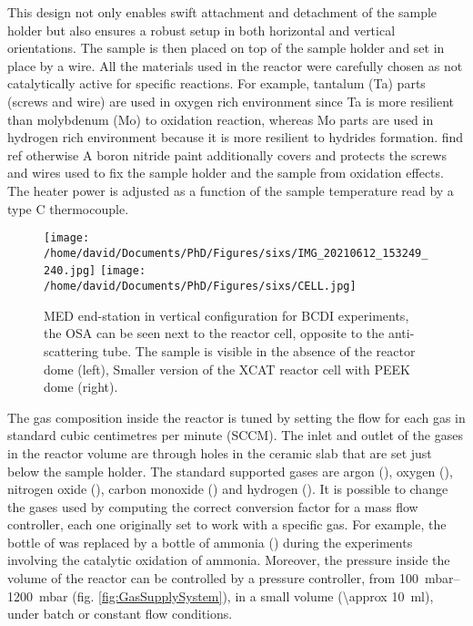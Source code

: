 This design not only enables swift attachment and detachment of the sample holder but also ensures a robust setup in both horizontal and vertical orientations.
The sample is then placed on top of the sample holder and set in place by a wire.
All the materials used in the reactor were carefully chosen as not catalytically active for specific reactions.
For example, tantalum (Ta) parts (screws and wire) are used in oxygen rich environment since Ta is more resilient than molybdenum (Mo) to oxidation reaction, whereas Mo parts are used in hydrogen rich environment because it is more resilient to hydrides formation.
\textcolor{Important}{find ref otherwise}
A boron nitride paint additionally covers and protects the screws and wires used to fix the sample holder and the sample from oxidation effects.
The heater power is adjusted as a function of the sample temperature read by a type C thermocouple.

\begin{figure}[!htb]
    \centering
    \texttt{[image: /home/david/Documents/PhD/Figures/sixs/IMG\_20210612\_153249\_240.jpg]}
    \texttt{[image: /home/david/Documents/PhD/Figures/sixs/CELL.jpg]}
    \caption{
        MED end-station in vertical configuration for BCDI experiments, the OSA can be seen next to the reactor cell, opposite to the anti-scattering tube.
        The sample is visible in the absence of the reactor dome (left),
        Smaller version of the XCAT reactor cell with PEEK dome (right).
    }
    \label{fig:MEDV}
\end{figure}

The gas composition inside the reactor is tuned by setting the flow for each gas in standard cubic centimetres per minute (SCCM).
The inlet and outlet of the gases in the reactor volume are through holes in the ceramic slab that are set just below the sample holder.
The standard supported gases are argon (\argon), oxygen (\dioxygen), nitrogen oxide (\nitricoxide), carbon monoxide () and hydrogen ().
It is possible to change the gases used by computing the correct conversion factor for a mass flow controller, each one originally set to work with a specific gas.
For example, the bottle of  was replaced by a bottle of ammonia (\ammonia) during the experiments involving the catalytic oxidation of ammonia.
Moreover, the pressure inside the volume of the reactor can be controlled by a pressure controller, from \qtyrange{100}{1200}{\milli\bar} (fig. \ref{fig:GasSupplySystem}), in a small volume (\qty{\approx 10}{\ml}), under batch or constant flow conditions.


